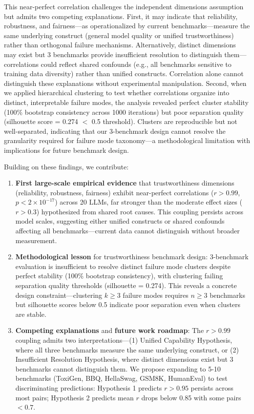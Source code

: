 This near-perfect correlation challenges the independent dimensions assumption but admits two competing explanations. First, it may indicate that reliability, robustness, and fairness---as operationalized by current benchmarks---measure the same underlying construct (general model quality or unified trustworthiness) rather than orthogonal failure mechanisms. Alternatively, distinct dimensions may exist but 3 benchmarks provide insufficient resolution to distinguish them---correlations could reflect shared confounds (e.g., all benchmarks sensitive to training data diversity) rather than unified constructs. Correlation alone cannot distinguish these explanations without experimental manipulation. Second, when we applied hierarchical clustering to test whether correlations organize into distinct, interpretable failure modes, the analysis revealed perfect cluster stability (100\% bootstrap consistency across 1000 iterations) but poor separation quality (silhouette score = 0.274 $<$ 0.5 threshold). Clusters are reproducible but not well-separated, indicating that our 3-benchmark design cannot resolve the granularity required for failure mode taxonomy---a methodological limitation with implications for future benchmark design.

Building on these findings, we contribute:

\begin{enumerate}
\item \textbf{First large-scale empirical evidence} that trustworthiness dimensions (reliability, robustness, fairness) exhibit near-perfect correlations ($r > 0.99$, $p < 2\times10^{-17}$) across 20 LLMs, far stronger than the moderate effect sizes ($r > 0.3$) hypothesized from shared root causes. This coupling persists across model scales, suggesting either unified constructs or shared confounds affecting all benchmarks---current data cannot distinguish without broader measurement.

\item \textbf{Methodological lesson} for trustworthiness benchmark design: 3-benchmark evaluation is insufficient to resolve distinct failure mode clusters despite perfect stability (100\% bootstrap consistency), with clustering failing separation quality thresholds (silhouette = 0.274). This reveals a concrete design constraint---clustering $k\geq3$ failure modes requires $n\geq3$ benchmarks but silhouette scores below 0.5 indicate poor separation even when clusters are stable.

\item \textbf{Competing explanations} and \textbf{future work roadmap}: The $r > 0.99$ coupling admits two interpretations---(1) Unified Capability Hypothesis, where all three benchmarks measure the same underlying construct, or (2) Insufficient Resolution Hypothesis, where distinct dimensions exist but 3 benchmarks cannot distinguish them. We propose expanding to 5-10 benchmarks (ToxiGen, BBQ, HellaSwag, GSM8K, HumanEval) to test discriminating predictions: Hypothesis 1 predicts $r > 0.95$ persists across most pairs; Hypothesis 2 predicts mean $r$ drops below 0.85 with some pairs $< 0.7$.
\end{enumerate}

